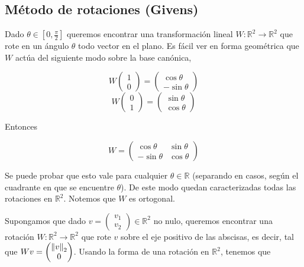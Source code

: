 \subsection{Método de rotaciones (Givens)}

Dado $\theta \in [0, \frac{\pi}{2}]$ queremos encontrar una transformación lineal $W : \mathbb{R}^2 \to \mathbb{R}^2$ que rote en un ángulo $\theta$ todo vector en el plano. Es fácil ver en forma geométrica que $W$ actúa del siguiente modo sobre la base canónica,

\[W\begin{pmatrix}1 \\ 0\end{pmatrix} = \begin{pmatrix}\cos\theta \\ -\sin \theta\end{pmatrix}\]
\[W\begin{pmatrix}0 \\ 1\end{pmatrix} = \begin{pmatrix}\sin\theta \\ \cos \theta\end{pmatrix}\]

Entonces

\[W = \begin{pmatrix}
\cos \theta & \sin \theta \\
-\sin \theta & \cos \theta
\end{pmatrix}\]

Se puede probar que esto vale para cualquier $\theta \in \mathbb{R}$ (separando en casos, según el cuadrante en que se encuentre $\theta$). De este modo quedan caracterizadas todas las rotaciones en $\mathbb{R}^2$. Notemos que $W$ es ortogonal.

Supongamos que dado $v = \begin{pmatrix}v_1 \\ v_2 \end{pmatrix} \in \mathbb{R}^2$ no nulo, queremos encontrar una rotación $W : \mathbb{R}^2 \to \mathbb{R}^2$ que rote $v$ sobre el eje positivo de las abscisas, es decir, tal que $Wv = \begin{pmatrix}\left\lVert v\right\rVert_2 \\ 0\end{pmatrix}$. Usando la forma de una rotación en $\mathbb{R}^2$, tenemos que

